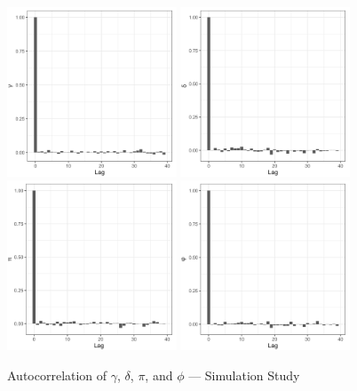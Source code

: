 \begin{figure}[H]
    \centering
    \includegraphics[width=0.45\textwidth]{../figures/simulation/acf_gamma.png}
    \includegraphics[width=0.45\textwidth]{../figures/simulation/acf_delta.png}
    \includegraphics[width=0.45\textwidth]{../figures/simulation/acf_pi.png}
    \includegraphics[width=0.45\textwidth]{../figures/simulation/acf_phi.png}
    \caption{Autocorrelation of $\gamma$, $\delta$, $\pi$, and $\phi$ --- Simulation Study}
    \label{fig:posterior_autocorrelation_2}
\end{figure}    
    
